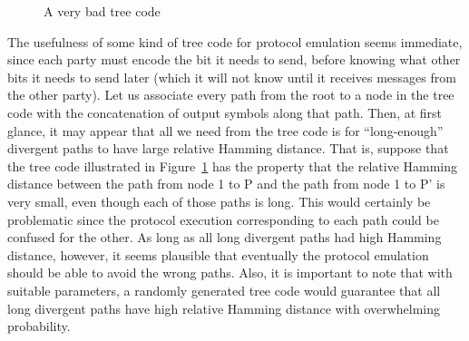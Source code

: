 \documentclass[ letterpaper, 11pt]{article}
\begin{document}
\begin{figure}[htb]
\begin{center}
\end{center}
\caption{A very bad tree code}
\label{fig:verybad}
\end{figure}
The usefulness of some kind of tree code for protocol emulation
seems immediate, since each party must encode the bit it needs to
send, before knowing what other bits it needs to send later (which
it will not know until it receives messages from the other party).
Let us associate every path from the root to a node in the tree code
with the concatenation of output symbols along that path.  Then, at
first glance, it may appear that all we need from the tree code is
for ``long-enough'' divergent paths to have large relative Hamming
distance.  That is, suppose that the tree code illustrated in
Figure~\ref{fig:verybad} has the property that the relative Hamming
distance between the path from node 1 to P and the path from node 1
to P' is very small, even though each of those paths is long.  This
would certainly be problematic since the protocol execution
corresponding to each path could be confused for the other.  As long
as all long divergent paths had high Hamming distance, however, it
seems plausible that eventually the protocol emulation should be
able to avoid the wrong paths.  Also, it is important to note that
with suitable parameters, a randomly generated tree code would
guarantee that all long divergent paths have high relative Hamming distance with overwhelming probability.
\end{document}
